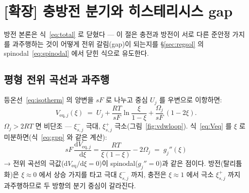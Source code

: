 \documentclass[11pt,a4paper]{article}
\newcommand{\dd}{\mathrm{d}}
\newcommand{\eq}{\mathrm{eq}}
\begin{document}
\section{[확장] 충방전 분기와 히스테리시스 gap}\label{sec:hys}
방전 본론은 식~\eqref{eq:total} 로 닫혔다 — 이 절은 충전과 방전이 서로 다른 준안정 가지를 과주행하는 것이 어떻게 전위 갈림(gap)이 되는지를 \S\ref{sec:regsol} 의 spinodal~\eqref{eq:spinodal} 에서 닫힌 식으로 유도한다.

\subsection{평형 전위 곡선과 과주행}
등온선~\eqref{eq:isotherm} 의 양변을 $sF$ 로 나누고 중심 $U_j$ 를 우변으로 이항하면:
\begin{equation}
V_{\eq,j}(\xi)\;=\;U_j+\frac{RT}{sF}\ln\frac{\xi}{1-\xi}+\frac{\Omega_j}{sF}\,(1-2\xi).
\label{eq:Veq}
\end{equation}
$\Omega_j>2RT$ 면 비단조 — $\xi_{s,j}^-$ 극대, $\xi_{s,j}^+$ 극소(그림~\ref{fig:vdwloop}). 식~\eqref{eq:Veq} 를 $\xi$ 로 미분하면(식~\eqref{eq:gpp} 와 같은 계산):
\begin{equation}
sF\,\frac{\dd V_{\eq,j}}{\dd\xi}
=\frac{RT}{\xi(1-\xi)}-2\Omega_j
\;=\;g_j''(\xi)
\label{eq:veqslope}
\end{equation}
→ 전위 곡선의 극값($\dd V_{\eq}/\dd\xi=0$)이 spinodal($g_j''=0$)과 같은 점이다. 방전(탈리튬화)은 $\xi\approx0$ 에서 상승 가지를 타고 극대 $\xi_{s,j}^-$ 까지, 충전은 $\xi\approx1$ 에서 극소 $\xi_{s,j}^+$ 까지 과주행하므로 두 방향의 분기 중심이 갈라진다.
\end{document}
